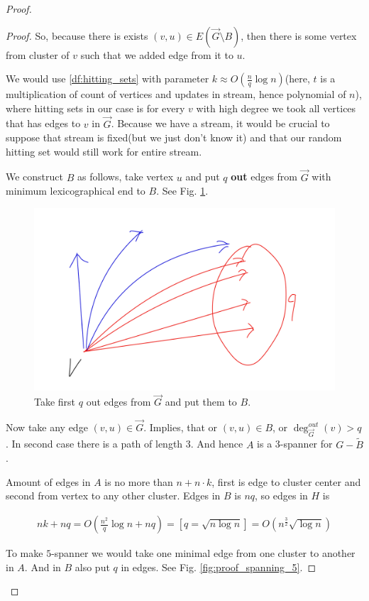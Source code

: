 \begin{proof}
\begin{proof}
  So, because there is exists $(v, u) \in E(\vec G \setminus B)$, then there is some vertex from cluster of $v$ such that we added edge from it to $u$.

  We would use \ref{df:hitting_sets} with parameter $k \approx O(\frac{n}{q} \log n)$(here, $t$ is a multiplication of count of vertices and updates in stream, hence polynomial of $n$), where hitting sets in our case is for every $v$ with high degree we took all vertices that has edges to $v$ in $\vec G$.
  Because we have a stream, it would be crucial to suppose that stream is fixed(but we just don't know it) and that our random hitting set would still work for entire stream.

  We construct $B$ as follows, take vertex $u$ and put $q$ \textbf{out} edges from $\vec G$ with minimum lexicographical end to $B$.
  See Fig. \ref{fig:proof_spanning_b_out}.

  \begin{figure}[H]
  	\centering
  	\includegraphics[width=0.4\linewidth]{figures/proof_spanning_b_out.jpeg}
  	\caption{Take first $q$ out edges from $\vec G$ and put them to $B$.}
  	\label{fig:proof_spanning_b_out}
  \end{figure}

  Now take any edge $(v, u) \in \vec G$.
  Implies, that or $(v, u) \in B$, or $\deg^{out}_{\vec G}(v) > q$.
  In second case there is a path of length 3. And hence $A$ is a 3-spanner for $G - \tilde B$.

  Amount of edges in $A$ is no more than $n + n \cdot k$, first is edge to cluster center and second from vertex to any other cluster.
  Edges in $B$ is $n q$, so edges in $H$ is 

  \begin{align*}
	  nk + nq = O\left(\frac{n^2}{q} \log n + n q\right) = [q = \sqrt{n \log n}] = O\left(n^{\frac{3}{2}} \sqrt {\log n}\right)
  \end{align*}

  To make $5$-spanner we would take one minimal edge from one cluster to another in $A$. And in $B$ also put $q$ in edges.
  See Fig. \ref{fig:proof_spanning_5}.


\end{proof}
\end{proof}
